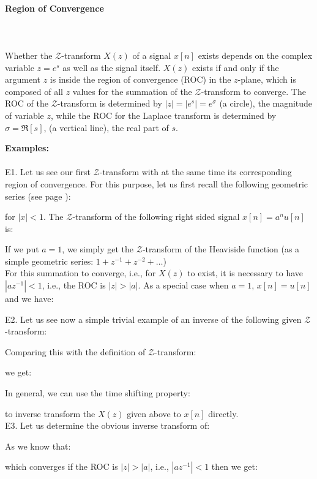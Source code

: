 	\paragraph{Region of Convergence}\mbox{}\\\\
	Whether the $\mathcal{Z}$-transform $X(z)$ of a signal $x[n]$ exists depends on the complex variable $z=e^s$ as well as the signal itself. $X(z)$ exists if and only if the argument $z$ is inside the region of convergence (ROC) in the $z$-plane, which is composed of all $z$ values for the summation of the $\mathcal{Z}$-transform to converge. The ROC of the $\mathcal{Z}$-transform is determined by $|z|=|e^s|=e^{\sigma}$ (a circle), the magnitude of variable $z$, while the ROC for the Laplace transform is determined by $\sigma=\Re[s]$, (a vertical line), the real part of $s$. 
	
	\begin{tcolorbox}[colframe=black,colback=white,sharp corners,breakable]
	\textbf{{\Large {}}Examples:}\\\\
	E1. Let us see our first $\mathcal{Z}$-transform with at the same time its corresponding region of convergence. For this purpose, let us first recall the following geometric series (see page \pageref{sum of powers}):
	
	for $|x|<1$. The $\mathcal{Z}$-transform of the following right sided signal $x[n]=a^n u[n]$ is:
	
	If we put $a=1$, we simply get the $\mathcal{Z}$-transform of the Heaviside function (as a simple geometric series: $1+z^{-1}+z^{-2}+\ldots$)\\
	
	For this summation to converge, i.e., for $X(z)$ to exist, it is necessary to have $| az^{-1} |<1$, i.e., the ROC is $|z| > |a|$. As a special case when $a=1$, $x[n]=u[n]$ and we have:
	
	E2. Let us see now a simple trivial example of an inverse of the following given $\mathcal{Z}$-transform:
	
	Comparing this with the definition of $\mathcal{Z}$-transform:
	
	we get:
	
	In general, we can use the time shifting property:
	
	to inverse transform the $X(z)$ given above to $x[n]$ directly.\\
	
	E3.  Let us determine the obvious inverse transform of:
	
	As we know that:
	
	which converges if the ROC is $|z|>|a|$, i.e., $|az^{-1}|<1$ then we get:
	
	\end{tcolorbox}
	
